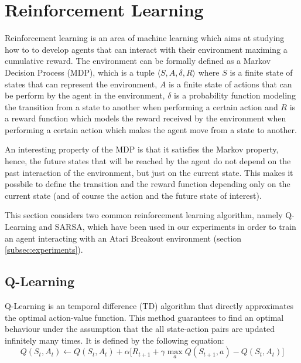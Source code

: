 \section{Reinforcement Learning}
Reinforcement learning \cite{Suttonrl18} is an area of machine learning
which aims at studying how to to develop agents that can interact with
their environment maximing a cumulative reward. The environment can be
formally defined as a Markov Decision Process (MDP), which is a tuple
$\langle S, A, \delta, R \rangle$ where $S$ is a finite state of states that can represent
the environment, $A$ is a finite state of actions that can be perform by
the agent in the environment, $\delta$ is a probability function modeling
the transition from a state to another when performing a certain action and
$R$ is a reward function which models the reward received by the environment
when performing a certain action which makes the agent move from a state
to another.

An interesting property of the MDP is that it satisfies the Markov property,
hence, the future states that will be reached by the agent do not depend
on the past interaction of the environment, but just on the current state.
This makes it possbile to define the transition and the reward function
depending only on the current state (and of course the action and the future
state of interest).

This section considers two common reinforcement learning algorithm,
namely Q-Learning and SARSA, which have been used in our experiments
in order to train an agent interacting with an Atari Breakout environment
(section \ref{subsec:experiments}).

\subsection{Q-Learning}
Q-Learning is an temporal difference (TD) algorithm that directly approximates
the optimal action-value
function. This method guarantees to find an optimal behaviour under the
assumption that the all state-action pairs are updated infinitely many times. It is
defined \cite{Suttonrl18} by the following equation:
\begin{equation}
    \label{eq:qlearning-update-function}
    Q(S_t, A_t) \leftarrow Q(S_t, A_t) + \alpha \Big[ R_{t+1} +
        \gamma \max_{a} Q(S_{t+1}, a) - Q(S_t, A_t) \Big]
\end{equation}

